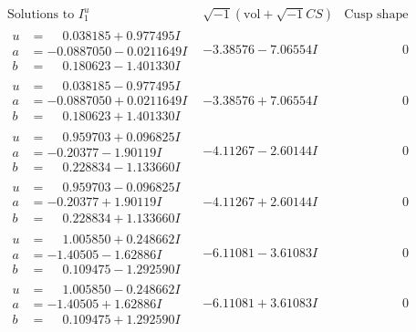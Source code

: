 \documentclass[1p]{elsarticle_modified}
\theoremstyle{definition}
\newcommand{\I}{\sqrt{-1}}
\begin{document}
$$\begin{array}{c|c|c}  
\text{Solutions to }I^u_{1}& \I (\text{vol} + \sqrt{-1}CS) & \text{Cusp shape}\\
 \hline 
\begin{aligned}
u &= \phantom{-}0.038185 + 0.977495 I \\
a &= -0.0887050 - 0.0211649 I \\
b &= \phantom{-}0.180623 - 1.401330 I\end{aligned}
 & -3.38576 - 7.06554 I & \phantom{-0.000000 } 0 \\ \hline\begin{aligned}
u &= \phantom{-}0.038185 - 0.977495 I \\
a &= -0.0887050 + 0.0211649 I \\
b &= \phantom{-}0.180623 + 1.401330 I\end{aligned}
 & -3.38576 + 7.06554 I & \phantom{-0.000000 } 0 \\ \hline\begin{aligned}
u &= \phantom{-}0.959703 + 0.096825 I \\
a &= -0.20377 - 1.90119 I \\
b &= \phantom{-}0.228834 - 1.133660 I\end{aligned}
 & -4.11267 - 2.60144 I & \phantom{-0.000000 } 0 \\ \hline\begin{aligned}
u &= \phantom{-}0.959703 - 0.096825 I \\
a &= -0.20377 + 1.90119 I \\
b &= \phantom{-}0.228834 + 1.133660 I\end{aligned}
 & -4.11267 + 2.60144 I & \phantom{-0.000000 } 0 \\ \hline\begin{aligned}
u &= \phantom{-}1.005850 + 0.248662 I \\
a &= -1.40505 - 1.62886 I \\
b &= \phantom{-}0.109475 - 1.292590 I\end{aligned}
 & -6.11081 - 3.61083 I & \phantom{-0.000000 } 0 \\ \hline\begin{aligned}
u &= \phantom{-}1.005850 - 0.248662 I \\
a &= -1.40505 + 1.62886 I \\
b &= \phantom{-}0.109475 + 1.292590 I\end{aligned}
 & -6.11081 + 3.61083 I & \phantom{-0.000000 } 0 \\ \hline\begin{aligned}

\end{aligned}
\end{array}$$
\end{document}
